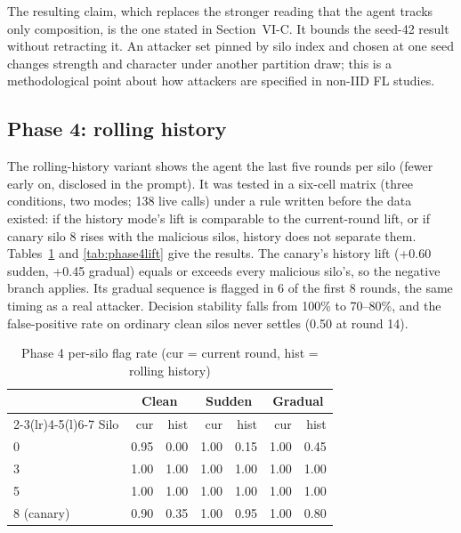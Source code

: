 The resulting claim, which replaces the stronger reading that the agent tracks only
composition, is the one stated in Section~VI-C. It bounds the seed-42 result without %
retracting it. An attacker set pinned by silo index and chosen at one seed changes
strength and character under another partition draw; this is a methodological point
about how attackers are specified in non-IID FL studies.

\subsection{Phase 4: rolling history}
The rolling-history variant shows the agent the last five rounds per silo (fewer early %
on, disclosed in the prompt). It was tested in a six-cell matrix (three conditions, two
modes; 138 live calls) under a rule written before the data existed: if the history %
mode's lift is comparable to the current-round lift, or if canary silo 8 rises with the %
malicious silos, history does not separate them. Tables~\ref{tab:phase4} and
\ref{tab:phase4lift} give the results. The canary's history lift (+0.60 sudden, +0.45 %
gradual) equals or exceeds every malicious silo's, so the negative branch applies. Its
gradual sequence is flagged in 6 of the first 8 rounds, the same timing as a real %
attacker. Decision stability falls from 100\% to 70--80\%, and the false-positive rate %
on ordinary clean silos never settles (0.50 at round 14). %

\begin{table}[h]
\centering
\caption{Phase 4 per-silo flag rate (cur = current round, hist = rolling history)}
\label{tab:phase4}
\footnotesize
\setlength{\tabcolsep}{3pt}
\begin{tabular}{@{}lrrrrrr@{}}
\toprule
 & \multicolumn{2}{c}{Clean} & \multicolumn{2}{c}{Sudden} & \multicolumn{2}{c}{Gradual}\\
\cmidrule(lr){2-3}\cmidrule(lr){4-5}\cmidrule(l){6-7}
Silo & cur & hist & cur & hist & cur & hist\\
\midrule
0 & 0.95 & 0.00 & 1.00 & 0.15 & 1.00 & 0.45\\ %
3 & 1.00 & 1.00 & 1.00 & 1.00 & 1.00 & 1.00\\ %
5 & 1.00 & 1.00 & 1.00 & 1.00 & 1.00 & 1.00\\ %
8 (canary) & 0.90 & 0.35 & 1.00 & 0.95 & 1.00 & 0.80\\ %
\bottomrule
\end{tabular}
\end{table}

